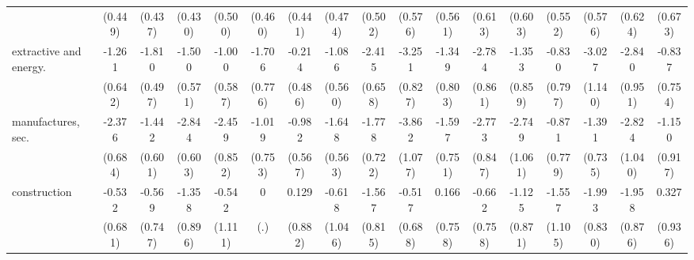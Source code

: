 {\begin{tabular}{l*{16}{c}}
                    &     (0.449)         &     (0.437)         &     (0.430)         &     (0.500)         &     (0.460)         &     (0.441)         &     (0.474)         &     (0.502)         &     (0.576)         &     (0.561)         &     (0.613)         &     (0.603)         &     (0.552)         &     (0.576)         &     (0.624)         &     (0.673)         \\
[1em]
extractive and energy.&      -1.261\sym{*}  &      -1.810\sym{***}&      -1.500\sym{**} &      -1.000         &      -1.706\sym{*}  &      -0.214         &      -1.086         &      -2.415\sym{***}&      -3.251\sym{***}&      -1.349         &      -2.784\sym{**} &      -1.353         &      -0.830         &      -3.027\sym{**} &      -2.840\sym{**} &      -0.837         \\
                    &     (0.642)         &     (0.497)         &     (0.571)         &     (0.587)         &     (0.776)         &     (0.486)         &     (0.560)         &     (0.658)         &     (0.827)         &     (0.803)         &     (0.861)         &     (0.859)         &     (0.797)         &     (1.140)         &     (0.951)         &     (0.754)         \\
[1em]
manufactures, sec.  &      -2.376\sym{***}&      -1.442\sym{*}  &      -2.844\sym{***}&      -2.459\sym{**} &      -1.019         &      -0.982         &      -1.648\sym{**} &      -1.778\sym{*}  &      -3.862\sym{***}&      -1.597\sym{*}  &      -2.773\sym{**} &      -2.749\sym{**} &      -0.871         &      -1.391         &      -2.824\sym{**} &      -1.150         \\
                    &     (0.684)         &     (0.601)         &     (0.603)         &     (0.852)         &     (0.753)         &     (0.567)         &     (0.563)         &     (0.722)         &     (1.077)         &     (0.751)         &     (0.847)         &     (1.061)         &     (0.779)         &     (0.735)         &     (1.040)         &     (0.917)         \\
[1em]
construction        &      -0.532         &      -0.569         &      -1.358         &      -0.542         &           0         &       0.129         &      -0.618         &      -1.567         &      -0.517         &       0.166         &      -0.662         &      -1.125         &      -1.557         &      -1.993\sym{*}  &      -1.958\sym{*}  &       0.327         \\
                    &     (0.681)         &     (0.747)         &     (0.896)         &     (1.111)         &         (.)         &     (0.882)         &     (1.046)         &     (0.815)         &     (0.688)         &     (0.758)         &     (0.758)         &     (0.871)         &     (1.105)         &     (0.830)         &     (0.876)         &     (0.936)         \\

\end{tabular}}
